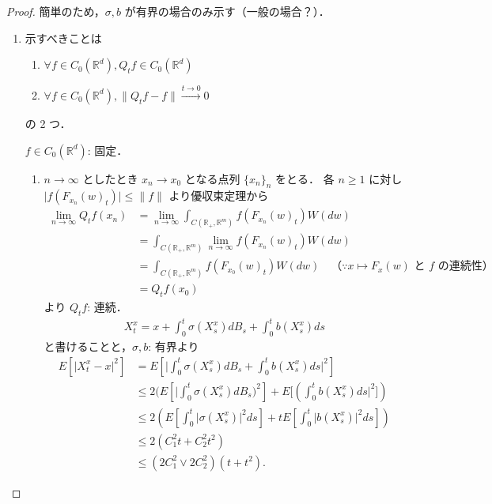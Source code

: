 \documentclass{jsarticle}
\begin{document}
\begin{proof}
    簡単のため，$\sigma, b$ が有界の場合のみ示す（一般の場合？）．
    \begin{enumerate}[label=(\arabic*)]
        \item
        示すべきことは
        \begin{enumerate}[label=(\roman*)]
            \item
            $\forall f\in C_{0}(\mathbb{R}^d), Q_{t}f\in C_{0}(\mathbb{R}^d)$
            \item
            $\forall f\in C_{0}(\mathbb{R}^d), \lVert Q_{t}f-f\rVert\xrightarrow{t\to0}0$
        \end{enumerate}
        の 2 つ．

        $f\in C_{0}(\mathbb{R}^d)$: 固定．
        \begin{enumerate}[label=(\roman*)]
            \item
            $n\to\infty$ としたとき $x_{n}\to x_{0}$ となる点列 $\{x_{n}\}_{n}$ をとる．
            各 $n\ge1$ に対し $\lvert f(F_{x_n}(w)_{t})\rvert\le\lVert f\rVert$ より優収束定理から
            \begin{align}
                \lim_{n\to\infty}Q_{t}f(x_{n})
                &= \lim_{n\to\infty}\int_{C(\mathbb{R_+}, \mathbb{R}^{m})}f(F_{x_{n}}(w)_{t})W(dw) \\
                &= \int_{C(\mathbb{R_+}, \mathbb{R}^{m})}\lim_{n\to\infty}f(F_{x_{n}}(w)_{t})W(dw) \\
                &= \int_{C(\mathbb{R_+}, \mathbb{R}^{m})}f(F_{x_{0}}(w)_{t})W(dw)
                \quad\text{（$\because x\mapsto F_{x}(w)$ と $f$ の連続性）} \\
                &= Q_{t}f(x_{0})
            \end{align}
            より $Q_{t}f$: 連続．
            \begin{align}
                X_{t}^{x}
                = x
                + \int_{0}^{t}\sigma(X_{s}^{x})dB_{s}
                + \int_{0}^{t}b(X_{s}^{x})ds
            \end{align}
            と書けることと，$\sigma, b$: 有界より
            \begin{align}
                E[\lvert X_{t}^{x}-x\rvert^2]
                &= E[\lvert \int_{0}^{t}\sigma(X_{s}^{x})dB_{s}
                + \int_{0}^{t}b(X_{s}^{x})ds\rvert^2] \\
                &\le 2(E[\lvert \int_{0}^{t}\sigma(X_{s}^{x})dB_{s})^2]
                + E[(\int_{0}^{t}b(X_{s}^{x})ds\rvert^2]) \\
                &\le 2(E[\int_{0}^{t}\lvert \sigma(X_{s}^{x})\rvert^{2}ds]
                + tE[\int_{0}^{t}\lvert b(X_{s}^{x})\rvert^{2}ds]) \\
                &\le 2(C_1^2 t+C_2^2 t^2) \\
                &\le (2C_1^2\vee 2C_2^2)(t+t^2).
            \end{align}


\end{enumerate}
\end{enumerate}
\end{proof}
\end{document}
